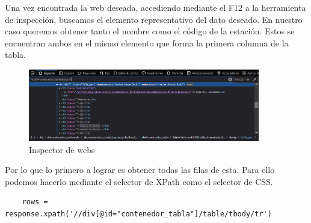 Una vez encontrada la web deseada, accediendo mediante el F12 a la herramienta de inspección, buscamos el elemento representativo del dato deseado. En nuestro caso queremos obtener tanto el nombre como el código de la estación. Estos se encuentran ambos en el mismo elemento que forma la primera columna de la tabla.\newline

\begin{figure} [H]
	\centering
	\includegraphics[width=0.9\textwidth]{fig/inspector.png}
	\caption[Inspector de webs de Chrome]{Inspector de webs}
	\label{fig:ej14}
\end{figure}

Por lo que lo primero a lograr es obtener todas las filas de esta. Para ello podemos hacerlo mediante el selector de XPath como el selector de CSS.\newline

\begin{verbatim}
	rows = response.xpath('//div[@id="contenedor_tabla"]/table/tbody/tr')
\end{verbatim}


